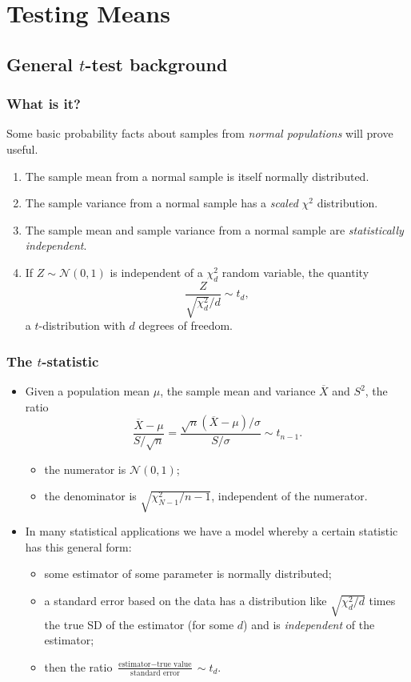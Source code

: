 \documentclass[a4paper]{article}\usepackage[]{graphicx}\usepackage[]{xcolor}
\begin{document}
\section{Testing Means}\label{sec:10}
\subsection{General \( t \)-test background}
\subsubsection{What is it?}
Some basic probability facts about samples from \textit{normal populations} will prove useful.
\begin{enumerate}
	\item The sample mean from a normal sample is itself normally distributed.
	\item The sample variance from a normal sample has a \textit{scaled} \( \chi^2 \) distribution.
	\item The sample mean and sample variance from a normal sample are \textit{statistically independent}.
	\item If \( Z \sim \mathcal{N}(0,1) \) is independent of a \( \chi^2_d \) random variable, the quantity
	\[
		\frac{Z}{\sqrt{\chi^2_d}/d} \sim t_d,
	\]
	a \( t \)-distribution with \( d \) degrees of freedom.
\end{enumerate}
\subsubsection{The \( t \)-statistic}
\begin{itemize}
	\item Given a population mean \( \mu \), the sample mean and variance \( \overline{X} \) and \( S^2 \), the ratio
	\[
		\frac{\overline{X}-\mu}{S / \sqrt{n}} = \frac{\sqrt{n}(\overline{X} - \mu)/\sigma}{S / \sigma} \sim t_{n-1}.
	\]
	\begin{itemize}
		\item the numerator is \( \mathcal{N}(0,1) \);
		\item the denominator is \( \sqrt{\chi^2_{N-1}/n-1} \), independent of the numerator.
	\end{itemize}
	\item In many statistical applications we have a model whereby a certain statistic has this general form:
	\begin{itemize}
		\item some estimator of some parameter is normally distributed;
		\item a standard error based on the data has a distribution like \( \sqrt{\chi^2_d/d} \) times the true SD of the estimator (for some \( d \)) and is \textit{independent} of the estimator;
		\item then the ratio \( \frac{\text{estimator}-\text{true value}}{\text{standard error}} \sim t_d \).
	\end{itemize}
\end{itemize}
\end{document}
